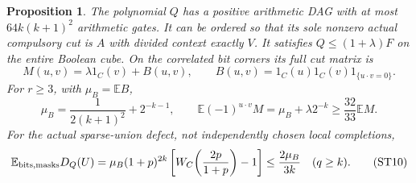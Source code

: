 \documentclass[11pt]{article}
\newtheorem{proposition}{Proposition}
\newcommand{\E}{\mathbb E}
\begin{document}
\begin{proposition}
The polynomial $Q$ has a positive arithmetic DAG with at most
$64k(k+1)^2$ arithmetic gates. It can be ordered so that its sole
nonzero actual compulsory cut is $A$ with divided context exactly $V$.
It satisfies $Q\le(1+\lambda)F$ on the entire Boolean cube.
On the correlated bit corners its full cut matrix is
\[
 M(u,v)=\lambda1_C(v)+B(u,v),\qquad
 B(u,v)=1_C(u)1_C(v)1_{\{u\cdot v=0\}}.
\]
For $r\ge3$, with $\mu_B=\E B$,
\[
 \mu_B=\frac1{2(k+1)^2}+2^{-k-1},\qquad
 \E(-1)^{u\cdot v}M=\mu_B+\lambda2^{-k}
                      \ge\frac{32}{33}\E M.             \tag{ST9}
\]
For the actual sparse-union defect, not independently chosen local
completions,
\[
 \E_{\rm bits,masks}D_Q(U)
   =\mu_B(1+p)^{2k}
       \left[W_C\!\left(\frac{2p}{1+p}\right)-1\right]
   \le \frac{2\mu_B}{3k}\quad(q\ge k).                   \tag{ST10}
\]
\end{proposition}
\end{document}
